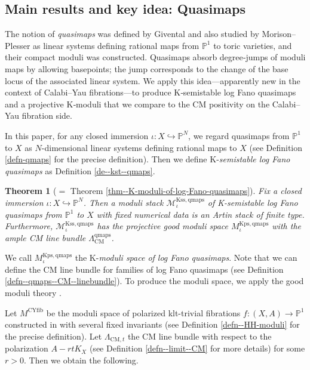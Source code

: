 \documentclass[12pt,twoside]{amsart}
\newtheorem{thm}{Theorem}[section]
\theoremstyle{definition}
\begin{document}
\subsection{Main results and key idea: Quasimaps}
The notion of {\it quasimaps} was defined by Givental \cite{givental} and also studied by Morison--Plesser \cite{DP2} as linear systems defining rational maps from $\mathbb{P}^1$ to toric varieties, and their compact moduli was constructed. 
Quasimaps absorb degree‑jumps of moduli maps by allowing basepoints; the jump corresponds to the change of the base locus of the associated linear system. We apply this idea—apparently new in the context of Calabi–Yau fibrations—to produce K‑semistable log Fano quasimaps and a projective K‑moduli that we compare to the CM positivity on the Calabi–Yau fibration side. 









   In this paper, for any closed immersion $\iota\colon X\hookrightarrow \mathbb{P}^N$, we regard quasimaps from $\mathbb{P}^1$ to $X$ as $N$-dimensional linear systems defining rational maps to $X$ (see Definition \ref{defn-qmaps} for the precise definition). 
Then we define K-{\it semistable log Fano quasimaps} as Definition \ref{de--kst--qmaps}.



\begin{thm}
[{$=$ Theorem \ref{thm--K-moduli-of-log-Fano-quasimaps}}]\label{main--thm--i}
Fix a closed immersion $\iota\colon X\hookrightarrow \mathbb{P}^N$.
Then a moduli stack $\mathcal{M}^{\mathrm{Kss,qmaps}}_\iota$ of K-semistable log Fano quasimaps from $\mathbb{P}^1$ to $X$ with fixed numerical data is an Artin stack of finite type.
Furthermore, $\mathcal{M}^{\mathrm{Kss,qmaps}}_\iota$ has the projective good moduli space ${M}^{\mathrm{Kps,qmaps}}_\iota$ with the ample CM line bundle $\Lambda^{\mathrm{qmaps}}_{\mathrm{CM}}$.
\end{thm}




We call $M_\iota^{\mathrm{Kps,qmaps}}$ the K-{\it moduli space of log Fano quasimaps}.
Note that we can define the CM line bundle for families of log Fano quasimaps (see Definition \ref{defn--qmaps--CM--linebundle}).
To produce the moduli space, we apply the good moduli theory \cite{AHLH}.

Let $M^{\mathrm{CYfib}}$ be the moduli space of polarized klt-trivial fibrations $f\colon (X,A)\to \mathbb{P}^1$ constructed in \cite{HH} with several fixed invariants (see Definition \ref{defn--HH-moduli} for the precise definition).
Let $\Lambda_{\mathrm{CM},t}$ the CM line bundle with respect to the polarization $A-rtK_{X}$ (see Definition \ref{defn--limit--CM} for more details) for some $r>0$.
Then we obtain the following.
\end{document}
